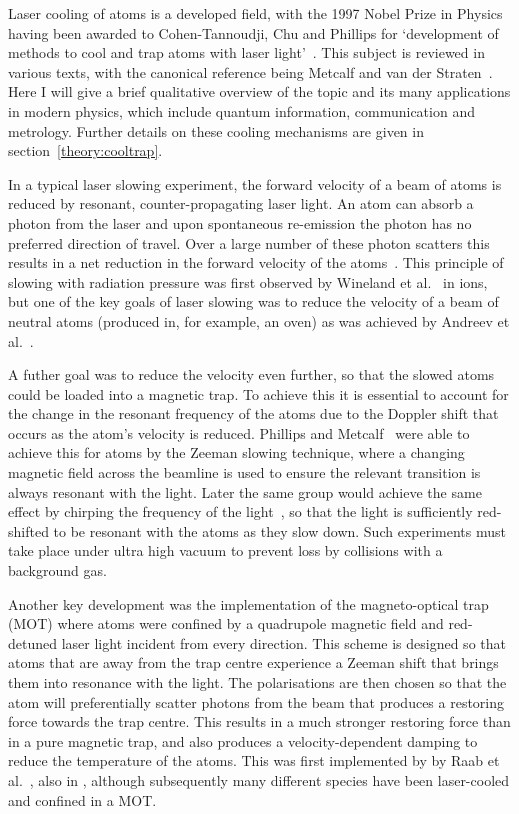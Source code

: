 Laser cooling of atoms is a developed field, with the 1997 Nobel Prize in
Physics having been awarded to Cohen-Tannoudji, Chu and Phillips for
`development of methods to cool and trap atoms with laser
light'~\cite{RevModPhys.70.721}. This subject is reviewed in various texts, with
the canonical reference being Metcalf and van der Straten~\cite{Metcalf1999}.
Here I will give a brief qualitative overview of the topic and its many
applications in modern physics, which include quantum information,
communication and metrology. Further details on these cooling mechanisms are
given in section~\ref{theory:cooltrap}.

In a typical laser slowing experiment, the forward velocity of a beam of atoms
is reduced by resonant, counter-propagating laser light. An atom can absorb a
photon from the laser and upon spontaneous re-emission the photon has no
preferred direction of travel. Over a large number of these photon scatters this
results in a net reduction in the forward velocity of the
atoms~\cite{PhysRevLett.40.1639}. This principle of slowing with radiation
pressure was first observed by Wineland et al.~\cite{PhysRevLett.40.1639} in
\Mg{} ions, but one of the key goals of laser slowing was to reduce the
velocity of a beam of neutral atoms (produced in, for example, an oven) as was
achieved by Andreev et al.~\cite{Andreev1981}.

A futher goal was to reduce the velocity even further, so that the slowed atoms
could be loaded into a magnetic trap.  To achieve this it is essential to
account for the change in the resonant frequency of the atoms due to the
Doppler shift that occurs as the atom's velocity is reduced. Phillips and
Metcalf~\cite{PhysRevLett.48.596} were able to achieve this for \Na{} atoms by
the Zeeman slowing technique, where a changing magnetic field across the
beamline is used to ensure the relevant transition is always resonant with the
light. Later the same group would achieve the same effect by chirping the
frequency of the light~\cite{Prodan1984}, so that the light is sufficiently
red-shifted to be resonant with the atoms as they slow down.  Such experiments
must take place under ultra high vacuum to prevent loss by collisions with a
background gas.

Another key development was the implementation of the magneto-optical trap
(MOT) where atoms were confined by a quadrupole magnetic field and red-detuned
laser light incident from every direction. This scheme is designed so that
atoms that are away from the trap centre experience a Zeeman shift that brings
them into resonance with the light. The polarisations are then chosen so that
the atom will preferentially scatter photons from the beam that produces a
restoring force towards the trap centre. This results in a much stronger
restoring force than in a pure magnetic trap, and also produces a
velocity-dependent damping to reduce the temperature of the atoms. This was
first implemented by by Raab et al.~\cite{PhysRevLett.59.2631}, also in \Na{},
although subsequently many different species have been laser-cooled and
confined in a MOT.

